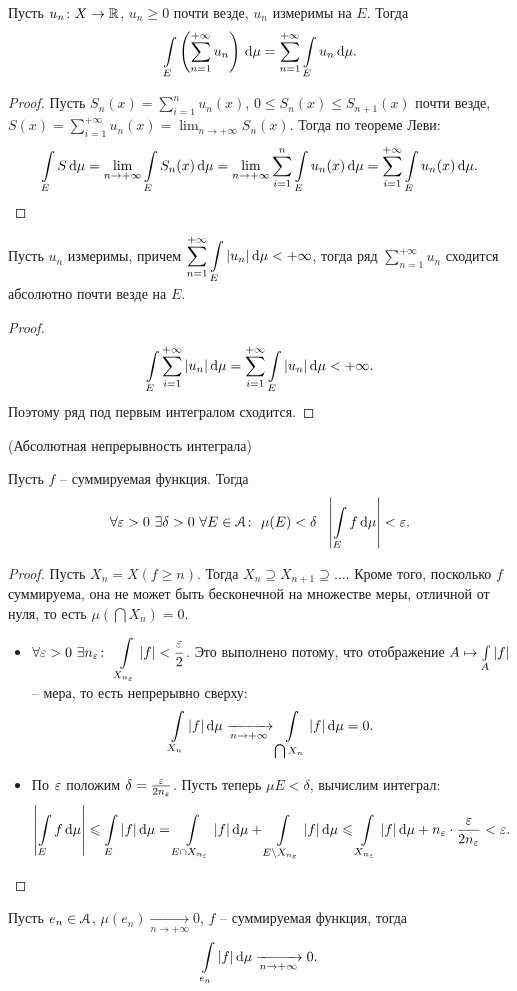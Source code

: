 \begin{theorem}
    Пусть $u_n \colon X \to \mathbb{R}$, $u_n \geqslant 0$ почти везде, $u_n$ измеримы на $E$.
    Тогда
    \[
        \int\limits_E{\left(\sum_{n = 1}^{+\infty}{u_n}\right) \,\mathrm{d}\mu} = \sum_{n = 1}^{+\infty}{\int\limits_E{u_n \,\mathrm{d}\mu}}
    .\]
\end{theorem}
\begin{proof}
    Пусть $\displaystyle S_n(x) = \sum_{i = 1}^n{u_n(x)}$, $0 \leqslant S_n(x) \leqslant S_{n + 1}(x)$ почти везде,
    $\displaystyle S(x) = \sum_{i = 1}^{+\infty}{u_n(x)} = \lim_{n \to +\infty}{S_n(x)}$.
    Тогда по теореме Леви:
    \[
        \int\limits_{E}{S \,\mathrm{d}\mu} = \lim_{n \to +\infty}{\int\limits_{E}{S_n(x) \,\mathrm{d}\mu}} =
        \lim_{n \to +\infty}{\sum_{i = 1}^n{\int\limits_{E}{u_n(x) \,\mathrm{d}\mu}}} =
        \sum_{i = 1}^{+\infty}{\int\limits_{E}{u_n(x) \,\mathrm{d}\mu}}
    .\]
\end{proof}

\begin{corollary}
    Пусть $u_n$ измеримы, причем $\displaystyle \sum_{n = 1}^{+\infty}{\int\limits_E{|u_n| \,\mathrm{d}\mu}} < +\infty$,
    тогда ряд $\displaystyle \sum_{n = 1}^{+\infty}{u_n}$ сходится абсолютно почти везде на $E$.
\end{corollary}
\begin{proof}
    \[
        \int\limits_{E}{\sum_{i = 1}^{+\infty}{|u_n|} \,\mathrm{d}\mu} = \sum_{i = 1}^{+\infty}{\int\limits_{E}{|u_n| \,\mathrm{d}\mu}} < +\infty
    .\]
    Поэтому ряд под первым интегралом сходится.
\end{proof}

\begin{theorem}(Абсолютная непрерывность интеграла)

    Пусть $f$ -- суммируемая функция. Тогда
    \[
        \forall \varepsilon > 0~ \exists \delta > 0~ \forall E \in \mathcal{A}\colon~ \mu(E) < \delta
        ~~ \left|\int\limits_E{f \,\mathrm{d}\mu}\right| < \varepsilon
    .\] 
\end{theorem}
\begin{proof}
    Пусть $X_n = X(f \geqslant n)$. Тогда $X_n \supseteq X_{n + 1} \supseteq \ldots$. Кроме того,
    посколько $f$ суммируема, она не может быть бесконечной на множестве меры, отличной от нуля, 
    то есть $\mu(\bigcap{X_n}) = 0$.
    \begin{itemize}
        \item $\displaystyle \forall \varepsilon > 0~ \exists n_\varepsilon\colon~ \int\limits_{X_{n_\varepsilon}}{|f|} < \frac{\varepsilon}{2}$.
            Это выполнено потому, что отображение $A \mapsto \int\limits_{A}{|f|}$ -- мера, то есть
            непрерывно сверху:
            \[
                \int\limits_{X_n}{|f| \,\mathrm{d}\mu} \xrightarrow[n \to +\infty]{} \int\limits_{\bigcap{X_n}}{|f| \,\mathrm{d}\mu} = 0
            .\]
        \item По $\varepsilon$ положим $\delta = \frac{\varepsilon}{2 n_\varepsilon}$. Пусть теперь $\mu{E} < \delta$,
            вычислим интеграл:
            \[
                \left|\int\limits_{E}{f \,\mathrm{d}\mu}\right| \leqslant \int\limits_{E}{|f| \,\mathrm{d}\mu} =
                \int\limits_{E \cap X_{n_\varepsilon}}{|f| \,\mathrm{d}\mu} + \int\limits_{E \setminus X_{n_\varepsilon}}{|f| \,\mathrm{d}\mu} \leqslant
                \int\limits_{X_{n_\varepsilon}}{|f| \,\mathrm{d}\mu} + n_\varepsilon \cdot \frac{\varepsilon}{2 n_\varepsilon} < \varepsilon
            .\]
    \end{itemize}
\end{proof}

\begin{corollary}
    Пусть $e_n \in \mathcal{A}$, $\mu(e_n) \xrightarrow[n \to +\infty]{} 0$, $f$ -- суммируемая функция,
    тогда
    \[
        \int\limits_{e_n}{|f| \,\mathrm{d}\mu} \xrightarrow[n \to +\infty]{} 0
    .\] 
\end{corollary}
